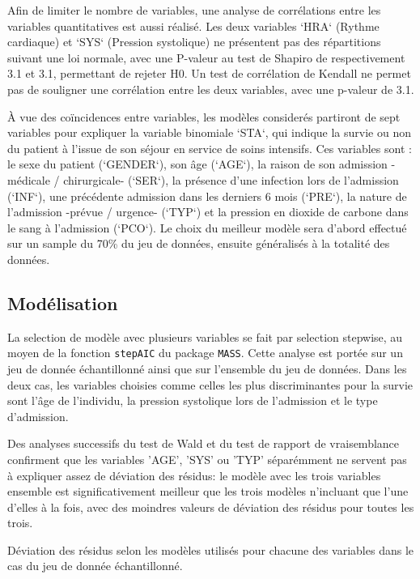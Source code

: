 \documentclass[10pt,a4paper,notitlepage,colorinlistoftodos]{article}
\begin{document}
Afin de limiter le nombre de variables, une analyse de corrélations entre les variables quantitatives est aussi réalisé. Les deux variables `HRA` (Rythme cardiaque) et `SYS` (Pression systolique) ne présentent pas des répartitions suivant une loi normale, avec une P-valeur au test de Shapiro de respectivement 3.1 et 3.1, permettant de rejeter H0. Un test de corrélation de Kendall ne permet pas de souligner une corrélation entre les deux variables, avec une p-valeur de 3.1.


À vue des coïncidences entre variables, les modèles considerés partiront de sept variables pour expliquer la variable binomiale `STA`, qui indique la survie ou non du patient à l'issue de son séjour en service de soins intensifs. Ces variables sont : le sexe du patient (`GENDER`), son âge (`AGE`), la raison de son admission -médicale / chirurgicale- (`SER`), la présence d'une infection lors de l'admission (`INF`), une précédente admission dans les derniers 6 mois (`PRE`), la nature de l'admission -prévue / urgence- (`TYP`) et la pression en dioxide de carbone dans le sang à l'admission (`PCO`). Le choix du meilleur modèle sera d'abord effectué sur un sample du 70\% du jeu de données, ensuite généralisés à la totalité des données. 

\subsection*{Modélisation}

La selection de modèle avec plusieurs variables se fait par selection stepwise, au moyen de la fonction \verb|stepAIC| du package \verb|MASS|. Cette analyse est portée sur un jeu de donnée échantillonné ainsi que sur l'ensemble du jeu de données. Dans les deux cas, les variables choisies comme celles les plus discriminantes pour la survie sont l'âge de l'individu, la pression systolique lors de l'admission et le type d'admission. 



Des analyses successifs du test de Wald et du test de rapport de vraisemblance confirment que les variables 'AGE', 'SYS' ou 'TYP' séparémment ne servent pas à expliquer assez de déviation des résidus: le modèle avec les trois variables ensemble est significativement meilleur que les trois modèles n'incluant que l'une d'elles à la fois, avec des moindres valeurs de déviation des résidus pour toutes les trois. 

\begin{table}[h]
  \begin{center}
  
  \end{center}
  \caption{Déviation des résidus selon les modèles utilisés pour chacune des variables dans le cas du jeu de donnée échantillonné.}
  \label{table:result1}
\end{table}
\end{document}

